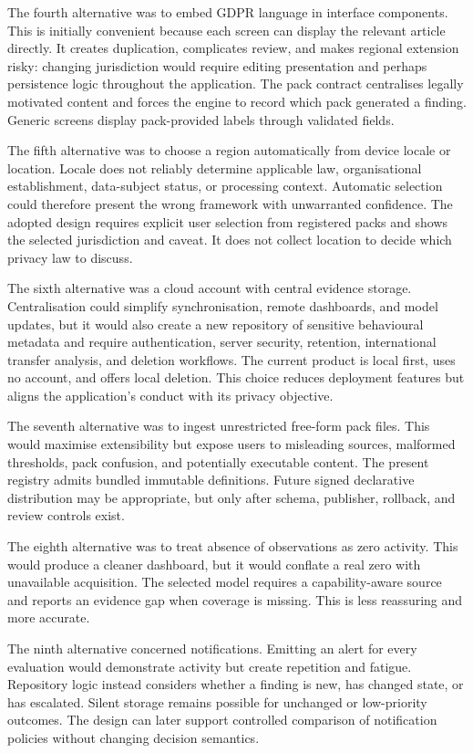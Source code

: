 The fourth alternative was to embed GDPR language in interface components. This is initially convenient because each screen can display the relevant article directly. It creates duplication, complicates review, and makes regional extension risky: changing jurisdiction would require editing presentation and perhaps persistence logic throughout the application. The pack contract centralises legally motivated content and forces the engine to record which pack generated a finding. Generic screens display pack-provided labels through validated fields.

The fifth alternative was to choose a region automatically from device locale or location. Locale does not reliably determine applicable law, organisational establishment, data-subject status, or processing context. Automatic selection could therefore present the wrong framework with unwarranted confidence. The adopted design requires explicit user selection from registered packs and shows the selected jurisdiction and caveat. It does not collect location to decide which privacy law to discuss.

The sixth alternative was a cloud account with central evidence storage. Centralisation could simplify synchronisation, remote dashboards, and model updates, but it would also create a new repository of sensitive behavioural metadata and require authentication, server security, retention, international transfer analysis, and deletion workflows. The current product is local first, uses no account, and offers local deletion. This choice reduces deployment features but aligns the application's conduct with its privacy objective.

The seventh alternative was to ingest unrestricted free-form pack files. This would maximise extensibility but expose users to misleading sources, malformed thresholds, pack confusion, and potentially executable content. The present registry admits bundled immutable definitions. Future signed declarative distribution may be appropriate, but only after schema, publisher, rollback, and review controls exist.

The eighth alternative was to treat absence of observations as zero activity. This would produce a cleaner dashboard, but it would conflate a real zero with unavailable acquisition. The selected model requires a capability-aware source and reports an evidence gap when coverage is missing. This is less reassuring and more accurate.

The ninth alternative concerned notifications. Emitting an alert for every evaluation would demonstrate activity but create repetition and fatigue. Repository logic instead considers whether a finding is new, has changed state, or has escalated. Silent storage remains possible for unchanged or low-priority outcomes. The design can later support controlled comparison of notification policies without changing decision semantics.

